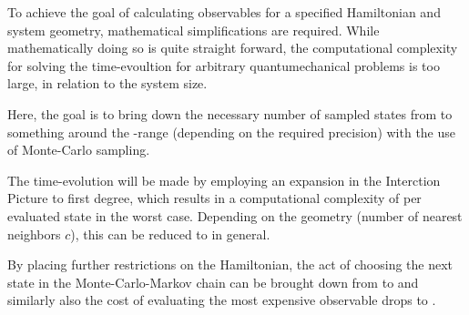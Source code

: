 To achieve the goal of calculating observables for a specified Hamiltonian and system geometry, mathematical simplifications are required. 
While mathematically doing so is quite straight forward, the computational complexity for solving the time-evoultion for arbitrary quantumechanical problems is too large, in relation to the system size.

Here, the goal is to bring down the necessary number of sampled states from  to something around the -range (depending on the required precision) with the use of Monte-Carlo sampling. 

The time-evolution will be made by employing an expansion in the Interction Picture to first degree, which results in a computational complexity of  per evaluated state in the worst case. 
Depending on the geometry (number of nearest neighbors $c$), this can be reduced to  in general.

By placing further restrictions on the Hamiltonian, the act of choosing the next state in the Monte-Carlo-Markov chain can be brought down from  to  and similarly also the cost of evaluating the most expensive observable drops to .